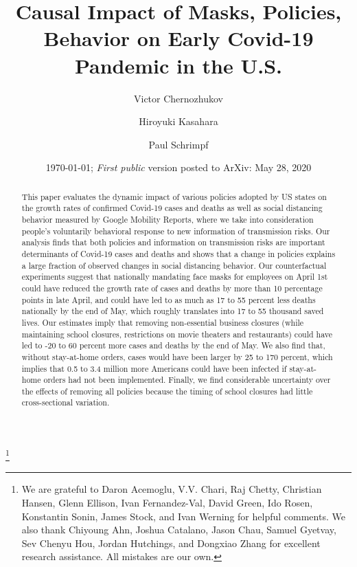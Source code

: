 \documentclass[11pt,reqno,letter]{amsart}
\theoremstyle{definition}
\begin{document}
\title[Causal Impact of Masks, Policies, Behavior]
{Causal Impact of Masks, Policies, Behavior on Early Covid-19 Pandemic in the U.S.}\thanks{We are grateful to Daron Acemoglu, V.V. Chari, Raj Chetty,  Christian Hansen, Glenn Ellison, Ivan Fernandez-Val, David Green,  Ido Rosen, Konstantin Sonin, James Stock, and Ivan Werning for helpful comments. We also thank Chiyoung Ahn,
Joshua Catalano,  Jason Chau, Samuel Gyetvay, Sev Chenyu Hou,
Jordan Hutchings, and Dongxiao Zhang  for excellent research assistance.  All mistakes are our own. }


\author{Victor Chernozhukov}
\address{Department of Economics and Center for Statistics and Data Science, MIT,  MA 02139}
\author{Hiroyuki Kasahara}
\address{ Vancouver School of Economics, UBC, 6000 Iona Drive, Vancouver, BC.}

\author{Paul Schrimpf}
\address{ Vancouver School of Economics, UBC, 6000 Iona Drive, Vancouver, BC.}


\date{\today; \textit{First public} version posted to ArXiv:  May 28, 2020}

\begin{abstract}
This paper evaluates the dynamic impact of various policies adopted by US states on the growth rates of confirmed Covid-19  cases and deaths as well as social distancing behavior measured by Google Mobility Reports, where we take into consideration people's voluntarily behavioral response to new information of transmission risks. Our analysis finds that both policies and information on transmission risks are important determinants of Covid-19  cases and deaths and shows that a change in policies explains a large fraction of observed changes in social distancing behavior. Our counterfactual experiments suggest that nationally mandating face masks for employees on April 1st could have reduced the growth rate of cases and deaths  by more than 10 percentage points in late April, and could have led to as much as 17 to 55 percent less deaths nationally by the end of May, which roughly translates into 17 to 55 thousand saved lives.   Our estimates imply that removing non-essential business closures  (while maintaining school closures, restrictions on  movie theaters and restaurants)  could have led to -20 to 60 percent more cases and deaths by the end of May. We also find that, without stay-at-home orders, cases would have been larger by  25 to 170 percent, which implies that 0.5 to 3.4 million more Americans could have been infected if stay-at-home orders had not been implemented. Finally,  we find considerable uncertainty over the effects of removing all policies because the timing of school closures had little cross-sectional variation.%
\end{abstract}
\end{document}
